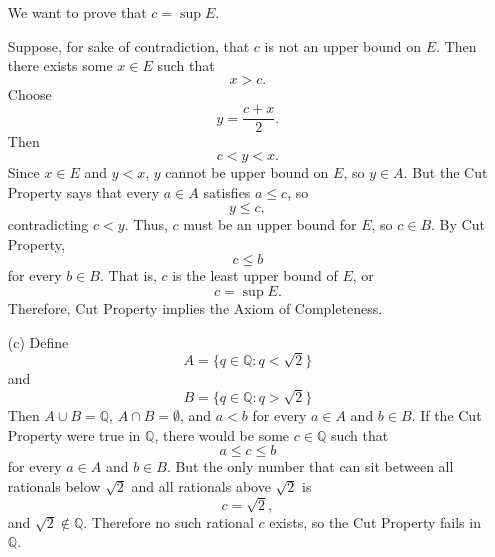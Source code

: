 \documentclass[12pt]{article}
\begin{document}
\begin{enumerate}
            We want to prove that $c = \sup E$.

            Suppose, for sake of contradiction, that $c$ is not an upper bound on $E$.
            Then there exists some $x \in E$ such that
            \[
                  x > c.
            \]
            Choose
            \[
                  y = \frac{c+x}{2}.
            \]
            Then
            \[
                  c < y < x.
            \]
            Since $x \in E$ and $y < x$, $y$ cannot be upper bound on $E$, so $y \in A$.
            But the Cut Property says that every $a \in A$ satisfies $a \leq c$, so
            \[
                  y \leq c,
            \]
            contradicting $c < y$.
            Thus, $c$ must be an upper bound for $E$, so $c \in B$.
            By Cut Property,
            \[ c \leq b\] for every $b \in B$. That is, $c$ is the least upper bound of $E$, or
            \[
                  c = \sup E.
            \]
            Therefore, Cut Property implies the Axiom of Completeness.
      \item [(c)]
            Define
            \[
                  A = \{q \in \mathbb{Q} : q < \sqrt{2} \}
            \]
            and
            \[
                  B = \{q \in \mathbb{Q} : q > \sqrt{2} \}
            \]
            Then $A \cup B = \mathbb{Q}$, $A \cap B = \emptyset$, and $a < b$ for every $a \in A$ and $b \in B$.
            If the Cut Property were true in \(\mathbb Q\), there would be some \(c\in\mathbb Q\) such that
            \[
                  a \leq c \leq b
            \]
            for every $a \in A$ and $b \in B$.
            But the only number that can sit between all rationals below \(\sqrt2\) and all rationals above \(\sqrt2\) is
            \[
                  c=\sqrt2,
            \]
            and \(\sqrt2\notin\mathbb Q\).
            Therefore no such rational \(c\) exists, so the Cut Property fails in \(\mathbb Q\).
\end{enumerate}
\end{document}
